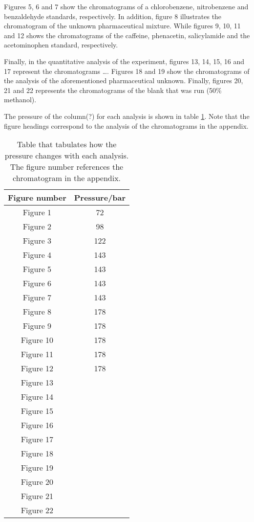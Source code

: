 \documentclass[a4paper, 12pt]{article}
\begin{document}
Figures 5, 6 and 7 show the chromatograms of a chlorobenzene, nitrobenzene and benzaldehyde standards, respectively. In addition, figure 8 illustrates the chromatogram of the unknown pharmaceutical mixture. While figures 9, 10, 11 and 12 shows the chromatograms of the caffeine, phenacetin, salicylamide and the acetominophen standard, respectively.

Finally, in the quantitative analysis of the experiment, figures 13, 14, 15, 16 and 17 represent the chromatograms \dots{}. Figures 18 and 19 show the chromatograms of the analysis of the aforementioned pharmaceutical unknown. Finally, figures 20, 21 and 22 represents the chromatograms of the blank that was run (50\% methanol).

The pressure of the column(?) for each analysis is shown in table \ref{tab-pressure}. Note that the figure headings correspond to the analysis of the chromatograms in the appendix.

\begin{table}[h!]
	\centering
	\begin{tabular}{|c|c|}
		\hline
		Figure number & Pressure/bar\\
		\hline
		Figure 1  & 72 \\ 
		\hline
		Figure 2 & 98 \\
		\hline
		Figure 3 & 122 \\
		\hline
		Figure 4 & 143 \\
		\hline
		Figure 5 & 143 \\
		\hline
		Figure 6 & 143 \\
		\hline
		Figure 7 & 143 \\
		\hline
		Figure 8 & 178 \\
		\hline
		Figure 9 & 178 \\
		\hline
		Figure 10 & 178 \\
		\hline
		Figure 11 & 178 \\
		\hline
		Figure 12 & 178 \\
		\hline
		Figure 13 & \\
		\hline
		Figure 14 & \\
		\hline
		Figure 15 & \\
		\hline
		Figure 16 & \\
		\hline
		Figure 17 & \\
		\hline
		Figure 18 & \\
		\hline
		Figure 19 & \\
		\hline
		Figure 20 & \\
		\hline
		Figure 21 & \\
		\hline
		Figure 22 &  \\ 
		\hline
	\end{tabular}
	\caption{Table that tabulates how the pressure changes with each analysis. The figure number references the chromatogram in the appendix.}
	\label{tab-pressure}
\end{table}
\end{document}
